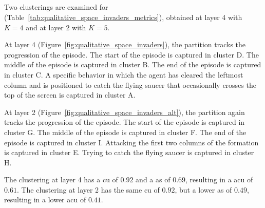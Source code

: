 \newpage
\subsection{\SpaceInvadersName}

Two clusterings are examined for \SpaceInvadersName (Table~\ref{tab:qualitative_space_invaders_metrics}), obtained at layer 4 with $K=4$ and at layer 2 with $K=5$.

At layer 4 (Figure~\ref{fig:qualitative_space_invaders}), the partition tracks the progression of the episode.
The start of the episode is captured in cluster D.
The middle of the episode is captured in cluster B.
The end of the episode is captured in cluster C.
A specific behavior in which the agent has cleared the leftmost column and is positioned to catch the flying saucer that occasionally crosses the top of the screen is captured in cluster A.

At layer 2 (Figure~\ref{fig:qualitative_space_invaders_alt}), the partition again tracks the progression of the episode.
The start of the episode is captured in cluster G.
The middle of the episode is captured in cluster F.
The end of the episode is captured in cluster I.
Attacking the first two columns of the formation is captured in cluster E.
Trying to catch the flying saucer is captured in cluster H.

The clustering at layer 4 has a \gls{cu} of $0.92$ and a \gls{as} of $0.69$, resulting in a \gls{acu} of $0.61$.
The clustering at layer 2 has the same \gls{cu} of $0.92$, but a lower \gls{as} of $0.49$, resulting in a lower \gls{acu} of $0.41$.


